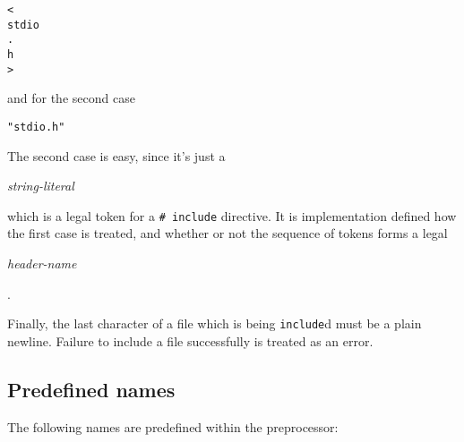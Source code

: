   \begin{Verbatim}
<
stdio
.
h
>
\end{Verbatim}

   and for the second case


   \begin{Verbatim}
"stdio.h"
\end{Verbatim}

   The second case is easy, since it's just a \begin{center}\textit{string-literal}\end{center}

    which is a legal token for a \texttt{\# include} directive. It is
    implementation defined how the first case is treated, and whether or not
    the sequence of tokens forms a legal \begin{center}\textit{header-name}\end{center}

.


   Finally, the last character of a file which is being
    \texttt{include}d must be a plain newline. Failure to include a file
    successfully is treated as an error.


  

  \subsection{Predefined names}
   

   The following names are predefined within the preprocessor:


